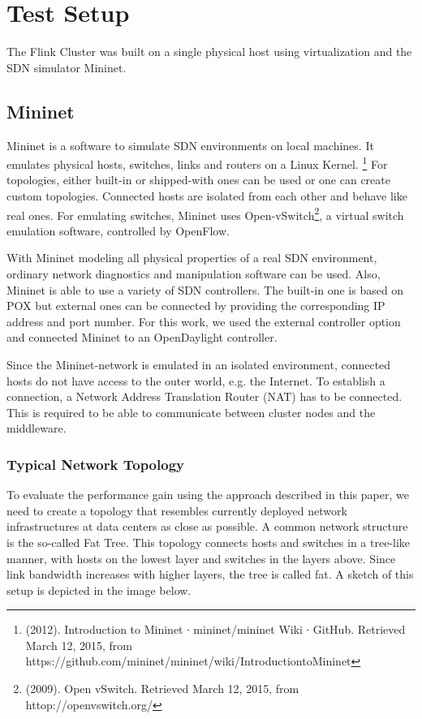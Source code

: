 \section{Test Setup}
The Flink Cluster was built on a single physical host using virtualization and the SDN simulator
Mininet.

\subsection{Mininet}
Mininet is a software to simulate SDN environments on local machines. It  emulates physical hosts,
switches, links and routers on a Linux Kernel. \footnote{(2012). Introduction to Mininet ∙
mininet/mininet Wiki ∙ GitHub. Retrieved March 12, 2015, from
https://github.com/mininet/mininet/wiki/Introduction­to­Mininet} For topologies, either built-in or
shipped-with ones can be used or one can create custom topologies. Connected hosts are isolated from
each other and behave like real ones. For emulating switches, Mininet uses
Open-vSwitch\footnote{(2009). Open vSwitch. Retrieved March 12, 2015, from
httop://openvswitch.org/}, a virtual switch emulation software, controlled by OpenFlow.

With Mininet modeling all physical properties of a real SDN environment, ordinary network
diagnostics and manipulation software can be used. Also, Mininet is able to use a variety of SDN
controllers. The built-in one is based on POX but external ones can be connected by providing the
corresponding IP address and port number. For this work, we used the external controller option and
connected Mininet to an OpenDaylight controller.

Since the Mininet-network is emulated in an isolated environment, connected hosts do not have access
to the outer world, e.g. the Internet. To establish a connection, a Network Address Translation
Router (NAT) has to be connected. This is required to be able to communicate between cluster nodes
and the middleware.

\subsubsection{Typical Network Topology}
To evaluate the performance gain using the approach described in this paper, we need to create a
topology that resembles currently deployed network infrastructures at data centers as close as
possible. A common network structure is the so-called Fat Tree. \cite{datacenter} This topology
connects hosts and switches in a tree-like manner, with hosts on the lowest layer and switches in
the layers above.  Since link bandwidth increases with higher layers, the tree is called fat. A
sketch of this setup is depicted in the image below.


